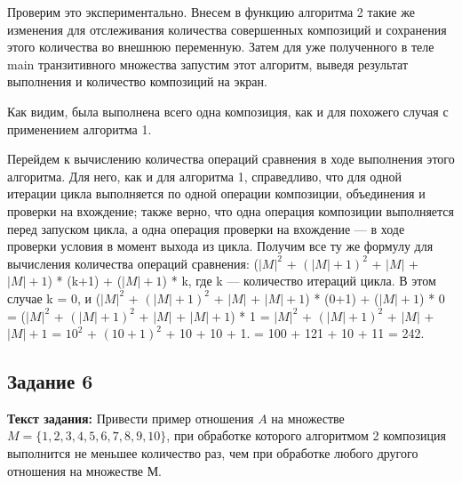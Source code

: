 \documentclass[12pt]{article}
\begin{document}
	Проверим это экспериментально. Внесем в функцию алгоритма 2 такие же изменения для отслеживания количества совершенных композиций и сохранения этого количества во внешнюю переменную. Затем для уже полученного в теле main транзитивного множества запустим этот алгоритм, выведя результат выполнения и количество композиций на экран.
	
	 

	
	\begin{figure}[h]
		\noindent{}
	\end{figure}
	
	Как видим, была выполнена всего одна композиция, как и для похожего случая с применением алгоритма 1. 
	
	Перейдем к вычислению количества операций сравнения в ходе выполнения этого алгоритма. Для него, как и для алгоритма 1, справедливо, что для одной итерации цикла выполняется по одной операции композиции, объединения и проверки на вхождение; также верно, что одна операция композиции выполняется перед запуском цикла, а одна операция проверки на вхождение --- в ходе проверки условия в момент выхода из цикла. Получим все ту же формулу для вычисления количества операций сравнения: ($|M|^2$ + $(|M|+1)^2$ + $|M|$ + $|M|+1$) * (k+1) + ($|M|+1$) * k, где k --- количество итераций цикла. В этом случае k = 0, и ($|M|^2$ + $(|M|+1)^2$ + $|M|$ + $|M|+1$) * (0+1) + ($|M|+1$) * 0 = ($|M|^2$ + $(|M|+1)^2$ + $|M|$ + $|M|+1$) * 1 = $|M|^2$ + $(|M|+1)^2$ + $|M|$ + $|M|+1$ = $10^2$ + $(10+1)^2$ + 10 + 10 + 1. = 100 + 121 + 10 + 11 = 242.
		
	\subsection{Задание 6}
	\label{task6}
	{\bf Текст задания:} Привести пример отношения $A$ на множестве $M = \{1, 2, 3, 4, 5, 6, 7, 8, 9, 10\}$, при обработке которого алгоритмом 2 композиция выполнится не меньшее количество раз, чем при обработке любого другого отношения на множестве М.
	
\end{document}
